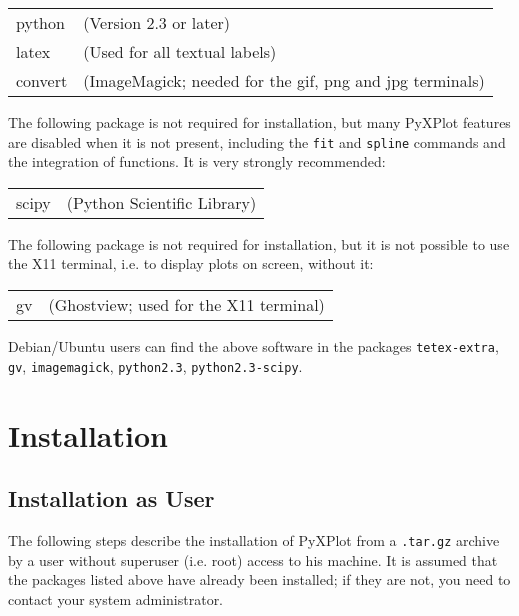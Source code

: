 \vspace{0.5cm}
\begin{tabular}{ll}
python  & (Version 2.3 or later) \\
latex   & (Used for all textual labels) \\
convert & (ImageMagick; needed for the gif, png and jpg terminals) \\
\end{tabular}
\vspace{0.5cm}

The following package is not required for installation, but many PyXPlot
features are disabled when it is not present, including the \texttt{fit} and
\texttt{spline} commands and the integration of functions. It is very strongly
recommended:

\vspace{0.5cm}
\begin{tabular}{ll} 
scipy   & (Python Scientific Library) \\
\end{tabular}
\vspace{0.5cm}

The following package is not required for installation, but it is not possible
to use the X11 terminal, i.e. to display plots on screen, without it:

\vspace{0.5cm}
\begin{tabular}{ll}
gv      & (Ghostview; used for the X11 terminal) \\
\end{tabular}
\vspace{0.5cm}

Debian/Ubuntu users can find the above software in the packages \texttt{tetex-extra},
\texttt{gv}, \texttt{imagemagick}, \texttt{python2.3},
\texttt{python2.3-scipy}.

\section{Installation}

\subsection{Installation as User}

The following steps describe the installation of PyXPlot from a
\texttt{.tar.gz} archive by a user without superuser (i.e. root) access to his
machine. It is assumed that the packages listed above have already been
installed; if they are not, you need to contact your system administrator.

